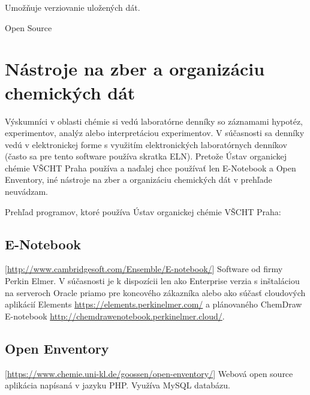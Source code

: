 \documentclass[thesis=M,slovak]{FITthesis}[2013/05/06]
\begin{document}
Umožňuje verziovanie uložených dát.

Open Source


\section{Nástroje na zber a organizáciu chemických dát}
Výskumníci v oblasti chémie si vedú laboratórne denníky so záznamami hypotéz, experimentov, analýz alebo interpretáciou experimentov. V súčasnosti sa denníky vedú v elektronickej forme s využitím elektronických laboratórnych denníkov (často sa pre tento software používa skratka ELN). Pretože Ústav organickej chémie VŠCHT Praha používa a naďalej chce používať len E-Notebook a Open Enventory, iné nástroje na zber a organizáciu chemických dát v prehľade neuvádzam.

Prehľad programov, ktoré používa Ústav organickej chémie VŠCHT Praha:
\subsection{E-Notebook} [\url{http://www.cambridgesoft.com/Ensemble/E-notebook/}]
Software od firmy Perkin Elmer. V súčasnosti je k dispozícii len ako Enterprise verzia s inštaláciou na serveroch Oracle priamo pre koncového zákazníka alebo ako súčasť cloudových aplikácií Elements \url{https://elements.perkinelmer.com/} a plánovaného ChemDraw E-notebook \url{http://chemdrawenotebook.perkinelmer.cloud/}.

\subsection{Open Enventory} [\url{https://www.chemie.uni-kl.de/goossen/open-enventory/}]
Webová open source aplikácia napísaná v jazyku PHP. Využíva MySQL databázu.




%
%
%
%
\end{document}
